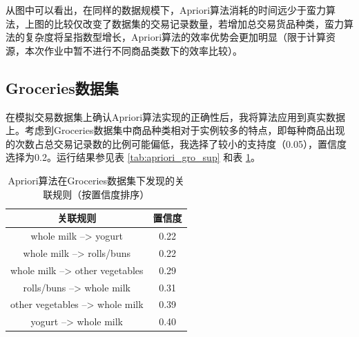 \documentclass[12pt,a4paper]{article}
\theoremstyle{definition}
\begin{document}
从图中可以看出，在同样的数据规模下，Apriori算法消耗的时间远少于蛮力算法，上图的比较仅改变了数据集的交易记录数量，若增加总交易货品种类，蛮力算法的复杂度将呈指数型增长，Apriori算法的效率优势会更加明显（限于计算资源，本次作业中暂不进行不同商品类数下的效率比较）。

\vspace{0.01\linewidth}
\subsection{Groceries数据集}

\vspace{0.01\linewidth}
在模拟交易数据集上确认Apriori算法实现的正确性后，我将算法应用到真实数据上。考虑到Groceries数据集中商品种类相对于实例较多的特点，即每种商品出现的次数占总交易记录数的比例可能偏低，我选择了较小的支持度（0.05），置信度选择为0.2。运行结果参见表 \ref{tab:apriori_gro_sup} 和表 \ref{tab:apriori_gro_con}。

\vspace{0.01\linewidth}
\begin{table}[H]
	\renewcommand\arraystretch{1.35}
	\caption{Apriori算法在Groceries数据集下发现的关联规则（按置信度排序）}
	\label{tab:apriori_gro_con}
	\centering
	
	\begin{tabular}{c|c}
		\centering
		关联规则 & 置信度 \\
		\hline
		whole milk --> yogurt & 0.22 \\
		whole milk --> rolls/buns & 0.22 \\
		whole milk --> other vegetables & 0.29 \\
		rolls/buns --> whole milk & 0.31 \\
		other vegetables --> whole milk & 0.39 \\
		yogurt --> whole milk & 0.40 \\
	\end{tabular}
\end{table}
\end{document}
